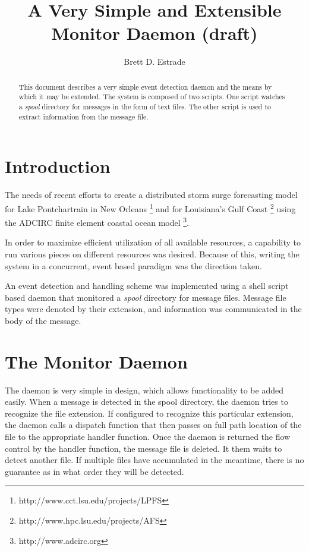 \documentclass[11pt,twocolumn]{article}
\begin{document}
\title{A Very Simple and Extensible Monitor Daemon (draft)} 
\author{Brett D. Estrade}


\normalsize

\setcounter{page}{1}

\maketitle

\begin{abstract}
This document describes a very simple event detection daemon and the means by which it may be extended.  The system is composed of two scripts. One script watches a \textit{spool} directory for messages in the form of text files.  The other script is used to extract information from the message file.
\end{abstract}

\section{Introduction}
\label{sec-intro}

The needs of recent efforts to create a distributed storm surge forecasting model for Lake Pontchartrain in New Orleans \footnote{http://www.cct.lsu.edu/projects/LPFS} and for Louisiana's Gulf Coast \footnote{http://www.hpc.lsu.edu/projects/AFS} using the ADCIRC finite element coastal ocean model \footnote{http://www.adcirc.org}.  

In order to maximize efficient utilization of all available resources, a capability to run various pieces on different resources was desired. Because of this, writing the system in a concurrent, event based paradigm was the direction taken.

An event detection and handling scheme was implemented using a shell script based daemon that monitored a \textit{spool} directory for message files.  Message file types were denoted by their extension, and information was communicated in the body of the message. 

\section{The Monitor Daemon}
\label{sec-daemon}

The daemon is very simple in design, which allows functionality to be added easily.  When a message is detected in the spool directory, the daemon tries to recognize the file extension.  If configured to recognize this particular extension, the daemon calls a dispatch function that then passes on full path location of the file to the appropriate handler function. Once the daemon is returned the flow control by the handler function, the message file is deleted.  It them waits to detect another file.  If multiple files have accumulated in the meantime, there is no guarantee as in what order they will be detected.
\end{document}
